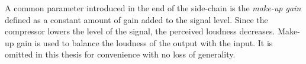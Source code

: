 \documentclass[../main2.tex]{subfiles}
\begin{document}
 A common parameter introduced in the end of the side-chain is the \emph{make-up gain} defined as a constant amount of gain added to the signal level. Since the compressor lowers the level of the signal, the perceived loudness decreases. Make-up gain is used to balance the loudness of the output with the input. It is omitted in this thesis for convenience with no loss of generality.
\end{document}

